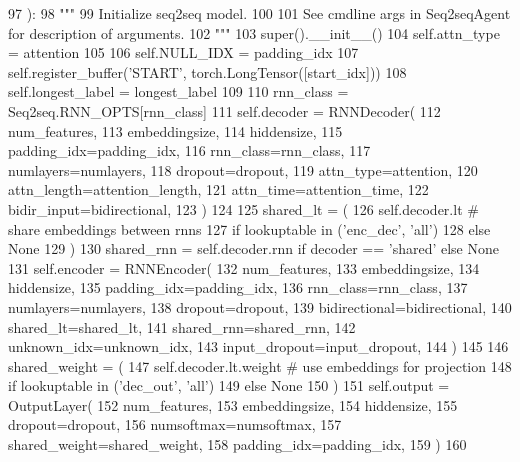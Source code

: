 \begin{DoxyCode}
97     ):
98         \textcolor{stringliteral}{"""}
99 \textcolor{stringliteral}{        Initialize seq2seq model.}
100 \textcolor{stringliteral}{}
101 \textcolor{stringliteral}{        See cmdline args in Seq2seqAgent for description of arguments.}
102 \textcolor{stringliteral}{        """}
103         super().\_\_init\_\_()
104         self.attn\_type = attention
105 
106         self.NULL\_IDX = padding\_idx
107         self.register\_buffer(\textcolor{stringliteral}{'START'}, torch.LongTensor([start\_idx]))
108         self.longest\_label = longest\_label
109 
110         rnn\_class = Seq2seq.RNN\_OPTS[rnn\_class]
111         self.decoder = RNNDecoder(
112             num\_features,
113             embeddingsize,
114             hiddensize,
115             padding\_idx=padding\_idx,
116             rnn\_class=rnn\_class,
117             numlayers=numlayers,
118             dropout=dropout,
119             attn\_type=attention,
120             attn\_length=attention\_length,
121             attn\_time=attention\_time,
122             bidir\_input=bidirectional,
123         )
124 
125         shared\_lt = (
126             self.decoder.lt  \textcolor{comment}{# share embeddings between rnns}
127             \textcolor{keywordflow}{if} lookuptable \textcolor{keywordflow}{in} (\textcolor{stringliteral}{'enc\_dec'}, \textcolor{stringliteral}{'all'})
128             \textcolor{keywordflow}{else} \textcolor{keywordtype}{None}
129         )
130         shared\_rnn = self.decoder.rnn \textcolor{keywordflow}{if} decoder == \textcolor{stringliteral}{'shared'} \textcolor{keywordflow}{else} \textcolor{keywordtype}{None}
131         self.encoder = RNNEncoder(
132             num\_features,
133             embeddingsize,
134             hiddensize,
135             padding\_idx=padding\_idx,
136             rnn\_class=rnn\_class,
137             numlayers=numlayers,
138             dropout=dropout,
139             bidirectional=bidirectional,
140             shared\_lt=shared\_lt,
141             shared\_rnn=shared\_rnn,
142             unknown\_idx=unknown\_idx,
143             input\_dropout=input\_dropout,
144         )
145 
146         shared\_weight = (
147             self.decoder.lt.weight  \textcolor{comment}{# use embeddings for projection}
148             \textcolor{keywordflow}{if} lookuptable \textcolor{keywordflow}{in} (\textcolor{stringliteral}{'dec\_out'}, \textcolor{stringliteral}{'all'})
149             \textcolor{keywordflow}{else} \textcolor{keywordtype}{None}
150         )
151         self.output = OutputLayer(
152             num\_features,
153             embeddingsize,
154             hiddensize,
155             dropout=dropout,
156             numsoftmax=numsoftmax,
157             shared\_weight=shared\_weight,
158             padding\_idx=padding\_idx,
159         )
160 
\end{DoxyCode}


